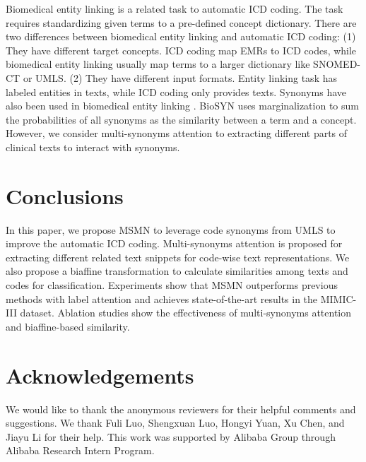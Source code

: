 \documentclass[11pt]{article}
\begin{document}
Biomedical entity linking is a related task to automatic ICD coding. The task requires standardizing given terms to a pre-defined concept dictionary. There are two differences between biomedical entity linking and automatic ICD coding: (1) They have different target concepts. ICD coding map EMRs to ICD codes, while biomedical entity linking usually map terms to a larger dictionary like SNOMED-CT or UMLS. (2) They have different input formats. Entity linking task has labeled entities in texts, while ICD coding only provides texts. Synonyms have also been used in biomedical entity linking \cite{sung-etal-2020-biomedical,yuan2021coder}.
BioSYN \cite{sung-etal-2020-biomedical} uses marginalization to sum the probabilities of all synonyms as the similarity between a term and a concept.
However, we consider multi-synonyms attention to extracting different parts of clinical texts to interact with synonyms.

\section{Conclusions}
In this paper, we propose MSMN to leverage code synonyms from UMLS to improve the automatic ICD coding.
Multi-synonyms attention is proposed for extracting different related text snippets for code-wise text representations.
We also propose a biaffine transformation to calculate similarities among texts and codes for classification.
Experiments show that MSMN outperforms previous methods with label attention and achieves state-of-the-art results in the MIMIC-III dataset.
Ablation studies show the effectiveness of multi-synonyms attention and biaffine-based similarity.


\section*{Acknowledgements}
We would like to thank the anonymous reviewers for their helpful comments and suggestions.
We thank Fuli Luo, Shengxuan Luo, Hongyi Yuan, Xu Chen, and Jiayu Li for their help.
This work was supported by Alibaba Group through Alibaba Research Intern Program.





\end{document}
